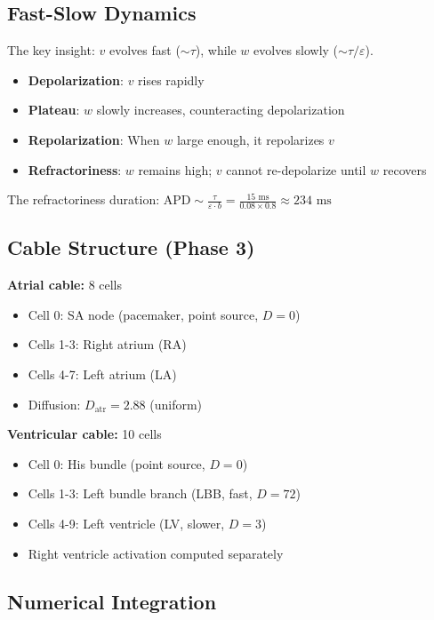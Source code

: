 \documentclass[12pt,a4paper]{article}
\begin{document}
\subsection{Fast-Slow Dynamics}

The key insight: $v$ evolves fast ($\sim \tau$), while $w$ evolves slowly ($\sim \tau/\varepsilon$).

\begin{itemize}
    \item \textbf{Depolarization}: $v$ rises rapidly
    \item \textbf{Plateau}: $w$ slowly increases, counteracting depolarization
    \item \textbf{Repolarization}: When $w$ large enough, it repolarizes $v$
    \item \textbf{Refractoriness}: $w$ remains high; $v$ cannot re-depolarize until $w$ recovers
\end{itemize}

The refractoriness duration: $\text{APD} \sim \frac{\tau}{\varepsilon \cdot b} = \frac{15 \text{ ms}}{0.08 \times 0.8} \approx 234 \text{ ms}$

\subsection{Cable Structure (Phase 3)}

\textbf{Atrial cable:} 8 cells
\begin{itemize}
    \item Cell 0: SA node (pacemaker, point source, $D=0$)
    \item Cells 1-3: Right atrium (RA)
    \item Cells 4-7: Left atrium (LA)
    \item Diffusion: $D_{\text{atr}} = 2.88$ (uniform)
\end{itemize}

\textbf{Ventricular cable:} 10 cells
\begin{itemize}
    \item Cell 0: His bundle (point source, $D=0$)
    \item Cells 1-3: Left bundle branch (LBB, fast, $D=72$)
    \item Cells 4-9: Left ventricle (LV, slower, $D=3$)
    \item Right ventricle activation computed separately
\end{itemize}

\subsection{Numerical Integration}
\end{document}

